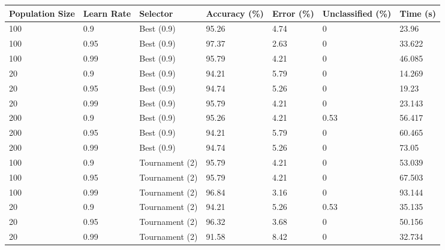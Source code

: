 \documentclass[a4paper]{article}
\begin{document}
\begin{table}[h!]
  \centering
  \begin{tabular}{@{}lllllll@{}}
    \toprule
    Population Size & Learn Rate & Selector       & Accuracy (\%) & Error (\%) & Unclassified (\%) & Time (s) \\
    \midrule
    100             & 0.9        & Best (0.9)     & 95.26         & 4.74       & 0                 & 23.96    \\
    100             & 0.95       & Best (0.9)     & 97.37         & 2.63       & 0                 & 33.622   \\
    100             & 0.99       & Best (0.9)     & 95.79         & 4.21       & 0                 & 46.085   \\
    20              & 0.9        & Best (0.9)     & 94.21         & 5.79       & 0                 & 14.269   \\
    20              & 0.95       & Best (0.9)     & 94.74         & 5.26       & 0                 & 19.23    \\
    20              & 0.99       & Best (0.9)     & 95.79         & 4.21       & 0                 & 23.143   \\
    200             & 0.9        & Best (0.9)     & 95.26         & 4.21       & 0.53              & 56.417   \\
    200             & 0.95       & Best (0.9)     & 94.21         & 5.79       & 0                 & 60.465   \\
    200             & 0.99       & Best (0.9)     & 94.74         & 5.26       & 0                 & 73.05    \\
    100             & 0.9        & Tournament (2) & 95.79         & 4.21       & 0                 & 53.039   \\
    100             & 0.95       & Tournament (2) & 95.79         & 4.21       & 0                 & 67.503   \\
    100             & 0.99       & Tournament (2) & 96.84         & 3.16       & 0                 & 93.144   \\
    20              & 0.9        & Tournament (2) & 94.21         & 5.26       & 0.53              & 35.135   \\
    20              & 0.95       & Tournament (2) & 96.32         & 3.68       & 0                 & 50.156   \\
    20              & 0.99       & Tournament (2) & 91.58         & 8.42       & 0                 & 32.734   \\

\end{tabular}
\end{table}
\end{document}
